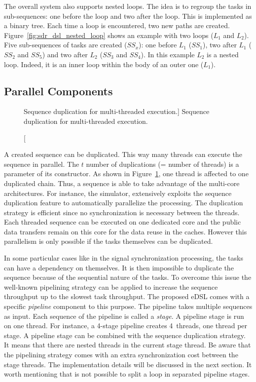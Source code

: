 The overall system also supports nested loops. The idea is to regroup the tasks
in sub-sequences: one before the loop and two after the loop. This is
implemented as a binary tree. Each time a loop is encountered, two new paths are
created. Figure~\ref{fig:sdr_dsl_nested_loop} shows an example with two loops
($L_1$ and $L_2$). Five sub-sequences of tasks are created ($SS_x$): one before
$L_1$ ($SS_1$), two after $L_1$ ($SS_2$ and $SS_5$) and two after $L_2$ ($SS_3$
and $SS_4$). In this example $L_2$ is a nested loop. Indeed, it is an inner loop
within the body of an outer one ($L_1$).

\subsection{Parallel Components}

\begin{figure}[htp]
  \centering
  \caption
    [Sequence duplication for multi-threaded execution.]
    {Sequence duplication for multi-threaded execution.}
  \label{fig:sdr_dsl_sequence_dup}
\end{figure}

A created sequence can be duplicated. This way many threads can execute the
sequence in parallel. The $t$ number of duplications (= number of threads) is a
parameter of its constructor. As shown in Figure~\ref{fig:sdr_dsl_sequence_dup},
one thread is affected to one duplicated chain. Thus, a sequence is able to take
advantage of the multi-core architectures. For instance, the \AFFECT simulator,
extensively exploits the sequence duplication feature to automatically
parallelize the processing. The duplication strategy is efficient since no
synchronization is necessary between the threads. Each threaded sequence can
be executed on one dedicated core and the public data transfers remain on this
core for the data reuse in the caches. However this parallelism is only possible
if the tasks themselves can be duplicated.

In some particular cases like in the signal synchronization processing, the
tasks can have a dependency on themselves. It is then impossible to duplicate
the sequence because of the sequential nature of the tasks. To overcome this
issue the well-known pipelining strategy can be applied to increase the sequence
throughput up to the slowest task throughput. The proposed eDSL comes with a
specific \emph{pipeline} component to this purpose. The pipeline takes multiple
sequences as input. Each sequence of the pipeline is called a \emph{stage}. A
pipeline stage is run on one thread. For instance, a 4-stage pipeline creates
4~threads, one thread per stage. A pipeline stage can be combined with the
sequence duplication strategy. It means that there are nested threads in the
current stage thread. Be aware that the pipelining strategy comes with an extra
synchronization cost between the stage threads. The implementation details will
be discussed in the next section. It worth mentioning that is not possible to
split a loop in separated pipeline stages.

